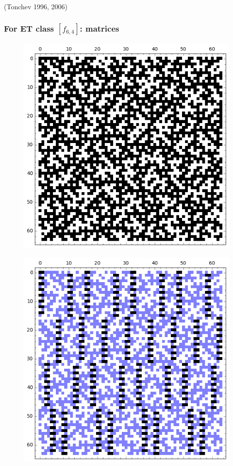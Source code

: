 \documentclass[pdf,sprung,slideColor,nocolorBG]{beamer}
\newenvironment{colortheme}[1]{
\def\ProvidesPackageRCS $##1${\relax}
\renewcommand{\ProcessOptions}{\relax}
\makeatletter

\makeatother
}{}
\newcommand{\slidecite}[1]{\tiny{(#1)}\normalsize{}}
\begin{document}
\begin{colortheme}{jubata}
\begin{frame}
\slidecite{Tonchev 1996, 2006}
\end{frame}
\begin{frame}
\frametitle{For ET class $[f_{6,4}]$: matrices}
\begin{figure}
\centering
\begin{minipage}{.48\textwidth}
  \centering
  \includegraphics[width=.9\linewidth]{../matrix_plot/re6_4_weight_class_matrix.png}
  \label{fig:6_4_weight_class_matrix}
\end{minipage}%
\begin{minipage}{.48\textwidth}
  \centering
  \includegraphics[width=.9\linewidth]{../matrix_plot/re6_4_bent_cayley_graph_index_matrix.png}

\end{minipage}
\end{figure}
\end{frame}
\end{colortheme}
\end{document}
